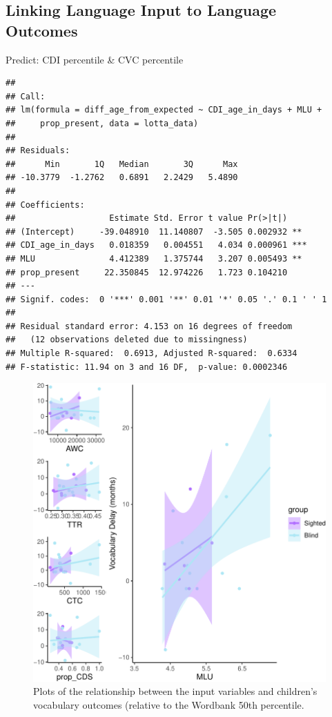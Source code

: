 \documentclass[
  man]{apa6}
\begin{document}
\hypertarget{linking-language-input-to-language-outcomes}{%
\subsection{Linking Language Input to Language Outcomes}\label{linking-language-input-to-language-outcomes}}

Predict: CDI percentile \& CVC percentile

\begin{verbatim}
## 
## Call:
## lm(formula = diff_age_from_expected ~ CDI_age_in_days + MLU + 
##     prop_present, data = lotta_data)
## 
## Residuals:
##      Min       1Q   Median       3Q      Max 
## -10.3779  -1.2762   0.6891   2.2429   5.4890 
## 
## Coefficients:
##                   Estimate Std. Error t value Pr(>|t|)    
## (Intercept)     -39.048910  11.140807  -3.505 0.002932 ** 
## CDI_age_in_days   0.018359   0.004551   4.034 0.000961 ***
## MLU               4.412389   1.375744   3.207 0.005493 ** 
## prop_present     22.350845  12.974226   1.723 0.104210    
## ---
## Signif. codes:  0 '***' 0.001 '**' 0.01 '*' 0.05 '.' 0.1 ' ' 1
## 
## Residual standard error: 4.153 on 16 degrees of freedom
##   (12 observations deleted due to missingness)
## Multiple R-squared:  0.6913, Adjusted R-squared:  0.6334 
## F-statistic: 11.94 on 3 and 16 DF,  p-value: 0.0002346
\end{verbatim}

\begin{figure}
\centering
\includegraphics{input_quality_manuscript_files/figure-latex/predicting-plots-1.pdf}
\caption{\label{fig:predicting-plots}Plots of the relationship between the input variables and children's vocabulary outcomes (relative to the Wordbank 50th percentile.}
\end{figure}
\end{document}

